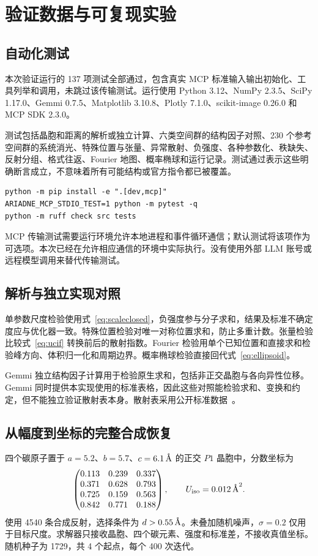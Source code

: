 \chapter{验证数据与可复现实验}
\label{app:validation}
\section{自动化测试}
本次验证运行的 137 项测试全部通过，包含真实 MCP 标准输入输出初始化、工具列举和调用，未跳过该传输测试。运行使用 Python 3.12、NumPy 2.3.5、SciPy 1.17.0、Gemmi 0.7.5、Matplotlib 3.10.8、Plotly 7.1.0、scikit-image 0.26.0 和 MCP SDK 2.3.0。

测试包括晶胞和距离的解析或独立计算、六类空间群的结构因子对照、230 个参考空间群的系统消光、特殊位置与张量、异常散射、负强度、各种参数化、秩缺失、反射分组、格式往返、Fourier 地图、概率椭球和运行记录。测试通过表示这些明确断言成立，不意味着所有可能结构或官方指令都已被覆盖。

\begin{lstlisting}
python -m pip install -e ".[dev,mcp]"
ARIADNE_MCP_STDIO_TEST=1 python -m pytest -q
python -m ruff check src tests
\end{lstlisting}
MCP 传输测试需要运行环境允许本地进程和事件循环通信；默认测试将该项作为可选项。本次已经在允许相应通信的环境中实际执行。没有使用外部 LLM 账号或远程模型调用来替代传输测试。

\section{解析与独立实现对照}
单参数尺度检验使用式~\eqref{eq:scaleclosed}，负强度参与分子求和，结果及标准不确定度应与优化器一致。特殊位置检验对唯一对称位置求和，防止多重计数。张量检验比较式~\eqref{eq:ucif} 转换前后的散射指数。Fourier 检验用单个已知位置和直接求和检验峰方向、体积归一化和周期边界。概率椭球检验直接回代式~\eqref{eq:ellipsoid}。

Gemmi 独立结构因子计算用于检验原生求和，包括非正交晶胞与各向异性位移。Gemmi 同时提供本实现使用的标准表格，因此这些对照能检验求和、变换和约定，但不能独立验证散射表本身。散射表采用公开标准数据~\cite{gemmi_scattering,gemmi_symmetry}。

\section{从幅度到坐标的完整合成恢复}
四个碳原子置于 $a=5.2$、$b=5.7$、$c=6.1\,\text{\AA}$ 的正交 $P1$ 晶胞中，分数坐标为
\begin{equation}
\begin{pmatrix}
0.113&0.239&0.337\\
0.371&0.628&0.793\\
0.725&0.159&0.563\\
0.842&0.771&0.188
\end{pmatrix},\qquad U_{\mathrm{iso}}=0.012\,\text{\AA}^2.
\end{equation}
使用 4540 条合成反射，选择条件为 $d>0.55\,\text{\AA}$。未叠加随机噪声，$\sigma=0.2$ 仅用于目标尺度。求解器只接收晶胞、四个碳元素、强度和标准差，不接收真值坐标。随机种子为 1729，共 4 个起点，每个 400 次迭代。

